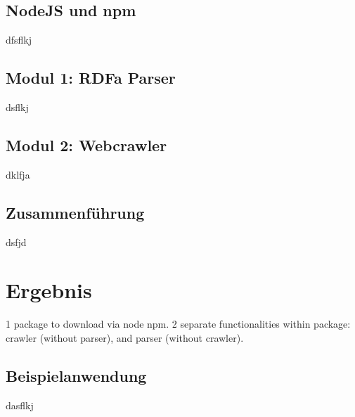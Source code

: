 \documentclass[hidelinks, a4paper, 11pt]{article} %
\begin{document}
\subsection{NodeJS und npm}

dfsflkj

\subsection{Modul 1: RDFa Parser}

dsflkj

\subsection{Modul 2: Webcrawler}

dklfja

\subsection{Zusammenf\"uhrung}

dsfjd




\section{Ergebnis}

1 package to download via node npm.
2 separate functionalities within package: crawler (without parser), and parser (without crawler).

\subsection{Beispielanwendung}

dasflkj


\renewcommand{\refname}{Referenzen}

\newpage



\end{document}
